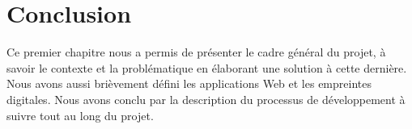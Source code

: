 \section{Conclusion}
Ce premier chapitre nous a permis de présenter le cadre général du projet, à
savoir le contexte et la problématique en élaborant une solution à cette
dernière. Nous avons aussi brièvement défini les applications Web et les
empreintes digitales. Nous avons conclu par la description du processus de
développement à suivre tout au long du projet.
